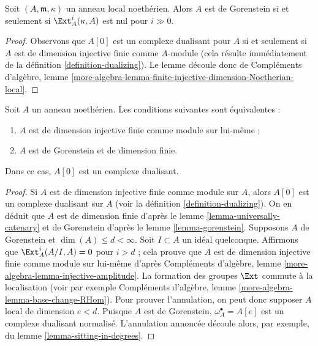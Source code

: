 \begin{lemma}
\label{lemma-gorenstein-ext}
Soit $(A, \mathfrak m, \kappa)$ un anneau local noethérien.
Alors $A$ est de Gorenstein si et seulement si $\Ext^i_A(\kappa, A)$ est nul pour $i \gg 0$.
\end{lemma}

\begin{proof}
Observons que $A[0]$ est un complexe dualisant pour $A$ si et seulement si
$A$ est de dimension injective finie comme $A$-module
(cela résulte immédiatement de la définition \ref{definition-dualizing}).
Le lemme découle donc de Compléments d'algèbre, lemme \ref{more-algebra-lemma-finite-injective-dimension-Noetherian-local}.
\end{proof}

\begin{lemma}
\label{lemma-characterize-gorenstein}
Soit $A$ un anneau noethérien. Les conditions suivantes sont équivalentes :
\begin{enumerate}
\item $A$ est de dimension injective finie comme module sur lui-même ;
\item $A$ est de Gorenstein et de dimension finie.
\end{enumerate}
Dans ce cas, $A[0]$ est un complexe dualisant.
\end{lemma}

\begin{proof}
Si $A$ est de dimension injective finie comme module sur $A$,
alors $A[0]$ est un complexe dualisant sur $A$
(voir la définition \ref{definition-dualizing}). On en déduit que $A$ est de dimension finie
d'après le lemme \ref{lemma-universally-catenary} et de Gorenstein d'après le lemme \ref{lemma-gorenstein}.
Supposons $A$ de Gorenstein et $\dim(A) \leq d < \infty$.
Soit $I \subset A$ un idéal quelconque. Affirmons que $\Ext^i_A(A/I, A) = 0$ pour $i > d$ ;
cela prouve que $A$ est de dimension injective finie comme module
sur lui-même d'après Compléments d'algèbre, lemme \ref{more-algebra-lemma-injective-amplitude}.
La formation des groupes $\Ext$ commute à la localisation
(voir par exemple Compléments d'algèbre, lemme \ref{more-algebra-lemma-base-change-RHom}).
Pour prouver l'annulation, on peut donc supposer $A$ local de dimension $e < d$.
Puisque $A$ est de Gorenstein, $\omega_A^\bullet = A[e]$ est un complexe dualisant normalisé.
L'annulation annoncée découle alors, par exemple, du lemme \ref{lemma-sitting-in-degrees}.
\end{proof}


